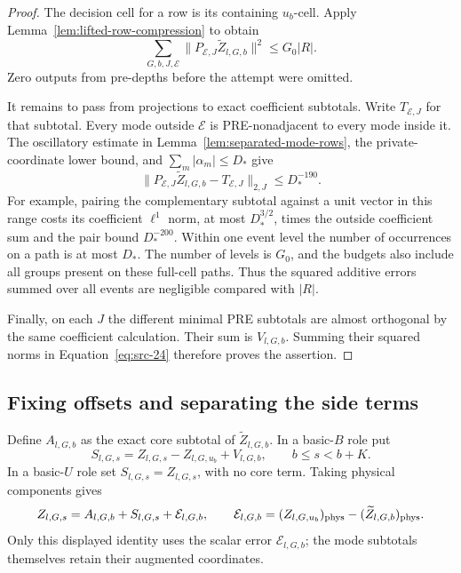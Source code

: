 \begin{proof}
The decision cell for a row is its containing \(u_b\)-cell.
Apply Lemma~\ref{lem:lifted-row-compression} to obtain
\begin{equation*}
 \sum_{G,b,J,\mathcal E}
   \|P_{\mathcal E,J}\widetilde Z_{l,G,b}\|^2
       \le G_0|R|.
 \tag{24}\label{eq:src-24}
\end{equation*}
Zero outputs from pre-depths before the attempt were omitted.

It remains to pass from projections to exact coefficient
subtotals.  Write \(T_{\mathcal E,J}\) for that subtotal.
Every mode outside \(\mathcal E\) is PRE-nonadjacent to every mode
inside it.  The oscillatory estimate in
Lemma~\ref{lem:separated-mode-rows}, the private-coordinate lower
bound, and \(\sum_m|\alpha_m|\le D_*\) give
\[
 \|P_{\mathcal E,J}\widetilde Z_{l,G,b}
                         -T_{\mathcal E,J}\|_{2,J}
       \le D_*^{-190}.
\]
For example, pairing the complementary subtotal against a unit
vector in this range costs its coefficient \(\ell^1\) norm,
at most \(D_*^{3/2}\), times the outside coefficient sum and the
pair bound \(D_*^{-200}\).
Within one event level the number of occurrences on a path is at
most \(D_*\).  The number of levels is \(G_0\), and the budgets
also include all groups present on these full-cell paths.
Thus the squared additive errors summed over all events are
negligible compared with \(|R|\).

Finally, on each \(J\) the different minimal PRE subtotals are
almost orthogonal by the same coefficient calculation.  Their sum
is \(V_{l,G,b}\).  Summing their squared norms in
Equation~\eqref{eq:src-24} therefore proves the assertion.
\end{proof}

\subsection{Fixing offsets and separating the side terms}

Define \(A_{l,G,b}\) as the exact core subtotal of
\(\widetilde Z_{l,G,b}\).  In a basic-\(B\) role put
\[
 S_{l,G,s}=Z_{l,G,s}-Z_{l,G,u_b}+V_{l,G,b},
 \qquad b\le s<b+K.
\]
In a basic-\(U\) role set \(S_{l,G,s}=Z_{l,G,s}\), with no core
term.  Taking physical components gives
\[
 Z_{l,G,s}=A_{l,G,b}+S_{l,G,s}+\mathcal E_{l,G,b},
 \qquad
 \mathcal E_{l,G,b}
       =(Z_{l,G,u_b})_{\mathrm{phys}}
           -(\widetilde Z_{l,G,b})_{\mathrm{phys}}.
\]
Only this displayed identity uses the scalar error
\(\mathcal E_{l,G,b}\); the mode subtotals themselves retain their
augmented coordinates.

